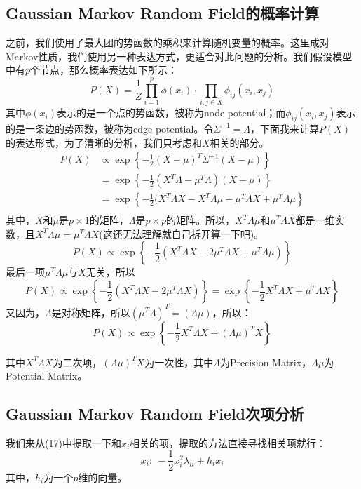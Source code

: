 \documentclass[a4paper]{article}
\begin{document}
\subsection{Gaussian Markov Random Field的概率计算}
之前，我们使用了最大团的势函数的乘积来计算随机变量的概率。这里成对Markov性质，我们使用另一种表达方式，更适合对此问题的分析。我们假设模型中有$p$个节点，那么概率表达如下所示：
\begin{equation}
    P(X) = \frac{1}{Z} \prod_{i=1}^p \phi(x_i) \cdot \prod_{i,j\in X} \phi_{ij}(x_i,x_j)
\end{equation}
其中$\phi(x_i)$表示的是一个点的势函数，被称为node potential；而$\phi_{ij}(x_i,x_j)$表示的是一条边的势函数，被称为edge potential。令$\Sigma^{-1}=\Lambda$，下面我来计算$P(X)$的表达形式，为了清晰的分析，我们只考虑和$X$相关的部分。
\begin{equation}
    \begin{split}
        P(X) & \propto \exp \left\{ -\frac{1}{2}(X-\mu)^T \Sigma^{-1} (X-\mu) \right\} \\
        & = \exp \left\{ -\frac{1}{2}(X^T\Lambda - \mu^T \Lambda ) (X-\mu) \right\} \\
        & = \exp \left\{ -\frac{1}{2}(X^T\Lambda X - X^T \Lambda \mu - \mu^T\Lambda X + \mu^T \Lambda \mu \right\} \\
    \end{split}
\end{equation}
其中，$X$和$\mu$是$p \times 1$的矩阵，$\Lambda$是$p \times p$的矩阵。所以，$X^T \Lambda \mu$和$\mu^T\Lambda X$都是一维实数，且$X^T \Lambda \mu =\mu^T\Lambda X $(这还无法理解就自己拆开算一下吧)。
$$
P(X) \propto \exp \left\{ -\frac{1}{2}(X^T\Lambda X - 2 \mu^T\Lambda X + \mu^T \Lambda \mu ) \right\}
$$
最后一项$\mu^T \Lambda \mu$与$X$无关，所以
$$
    P(X) \propto \exp \left\{ -\frac{1}{2}(X^T\Lambda X - 2 \mu^T\Lambda X ) \right\} = \exp \left\{ -\frac{1}{2} X^T\Lambda X + \mu^T\Lambda X  \right\}
$$
又因为，$\Lambda$是对称矩阵，所以$(\mu^T\Lambda)^T = (\Lambda \mu) $，所以：
\begin{equation}
    P(X) \propto \exp \left\{ -\frac{1}{2} X^T\Lambda X + (\Lambda \mu)^T X \right\}
\end{equation}

其中$X^T\Lambda X$为二次项，$(\Lambda \mu)^T X$为一次性，其中$\Lambda$为Precision Matrix，$\Lambda \mu$为Potential Matrix。

\subsection{Gaussian Markov Random Field次项分析}
我们来从(17)中提取一下和$x_i$相关的项，提取的方法直接寻找相关项就行：
\begin{equation}
    x_i:\ -\frac{1}{2} x_i^2 \lambda_{ii} + h_ix_i
\end{equation}
其中，$h_i$为一个$p$维的向量。
\end{document}
